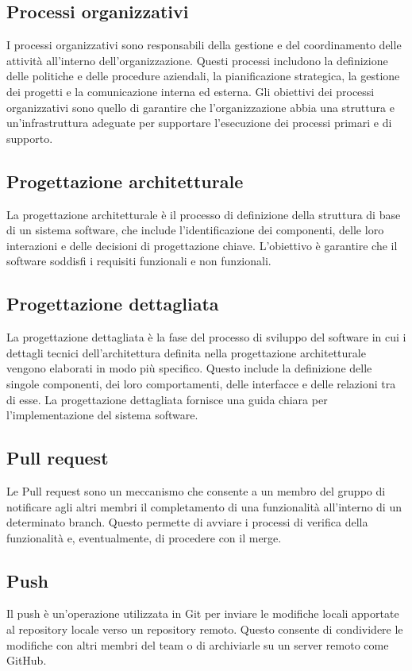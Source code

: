 \subsection{Processi organizzativi} 
I processi organizzativi sono responsabili della gestione e del coordinamento delle attività all'interno dell'organizzazione. Questi processi includono la definizione delle politiche e delle procedure aziendali, la pianificazione strategica, la gestione dei progetti e la comunicazione interna ed esterna. Gli obiettivi dei processi organizzativi sono quello di garantire che l'organizzazione abbia una struttura e un'infrastruttura adeguate per supportare l'esecuzione dei processi primari e di supporto.
\subsection{Progettazione architetturale} 
La progettazione architetturale è il processo di definizione della struttura di base di un sistema software, che include l'identificazione dei componenti, delle loro interazioni e delle decisioni di progettazione chiave. L'obiettivo è garantire che il software soddisfi i requisiti funzionali e non funzionali. 
\subsection{Progettazione dettagliata} 
La progettazione dettagliata è la fase del processo di sviluppo del software in cui i dettagli tecnici dell'architettura definita nella progettazione architetturale vengono elaborati in modo più specifico. Questo include la definizione delle singole componenti, dei loro comportamenti, delle interfacce e delle relazioni tra di esse. La progettazione dettagliata fornisce una guida chiara per l'implementazione del sistema software. 
\subsection{Pull request} 
Le Pull request sono un meccanismo che consente a un membro del gruppo di notificare agli altri membri il completamento di una funzionalità all'interno di un determinato branch. Questo permette di avviare i processi di verifica della funzionalità e, eventualmente, di procedere con il merge.
\subsection{Push} 
Il push è un'operazione utilizzata in Git per inviare le modifiche locali apportate al repository locale verso un repository remoto. Questo consente di condividere le modifiche con altri membri del team o di archiviarle su un server remoto come GitHub. 
